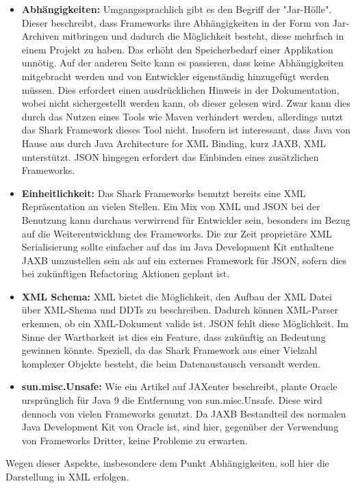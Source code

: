 \documentclass[a4paper]{article}
\begin{document}
	\begin{itemize}
		\item \textbf{Abhängigkeiten:} Umgangssprachlich gibt es den Begriff der
		"Jar-Hölle". Dieser beschreibt, dass Frameworks ihre Abhängigkeiten in der
		Form von Jar-Archiven mitbringen und dadurch die Möglichkeit besteht, diese
		mehrfach in einem Projekt zu haben. Das erhöht den Speicherbedarf einer
		Applikation unnötig. Auf der anderen Seite kann es passieren, dass keine
		Abhängigkeiten mitgebracht werden und von Entwickler eigenständig
		hinzugefügt werden müssen. Dies erfordert einen ausdrücklichen Hinweis in
		der Dokumentation, wobei nicht sichergestellt werden kann, ob dieser
		gelesen	wird. Zwar kann dies durch das Nutzen eines Tools wie Maven
		verhindert werden, allerdings nutzt das Shark Framework dieses Tool nicht.
		Insofern ist interessant, dass Java von Hause aus durch Java Architecture 
		for XML Binding, kurz JAXB, XML unterstützt.
		JSON hingegen erfordert das Einbinden eines zusätzlichen Frameworks.
		\item \textbf{Einheitlichkeit:} Das Shark Frameworks benutzt bereits eine
		XML Repräsentation an vielen Stellen. Ein Mix von XML und JSON bei der
		Benutzung kann durchaus verwirrend für Entwickler sein, besonders
		im Bezug auf die Weiterentwicklung des Frameworks. Die zur Zeit proprietäre
		XML Serialisierung sollte einfacher auf das im Java Development Kit
		enthaltene JAXB umzustellen sein als auf ein externes Framework für JSON,
		sofern dies bei zukünftigen Refactoring Aktionen geplant ist.
		\newpage
		\item \textbf{XML Schema:} XML bietet die Möglichkeit, den
		Aufbau der XML Datei über XML-Shema und DDTs zu beschreiben. Dadurch
		können XML-Parser erkennen, ob ein XML-Dokument valide ist. JSON fehlt
		diese Möglichkeit. Im Sinne der Wartbarkeit ist dies ein Feature, dass
		zukünftig an Bedeutung gewinnen könnte. Speziell, da das Shark Framework
		aus einer Vielzahl komplexer Objekte besteht, die beim Datenaustausch
		versandt werden.
		\item \textbf{sun.misc.Unsafe:} Wie ein Artikel auf JAXenter \cite{unsafe}
		beschreibt, plante Oracle ursprünglich für Java 9 die Entfernung von
		sun.misc.Unsafe. Diese wird dennoch von vielen Frameworks genutzt. Da
		JAXB Bestandteil des normalen Java Development Kit von Oracle ist, sind
		hier, gegenüber der Verwendung von Frameworks Dritter, keine Probleme zu
		erwarten.	
	\end{itemize} 	
	
	Wegen dieser Aspekte, insbesondere dem Punkt Abhängigkeiten, soll hier die
	Darstellung in XML erfolgen.
	
\end{document}
